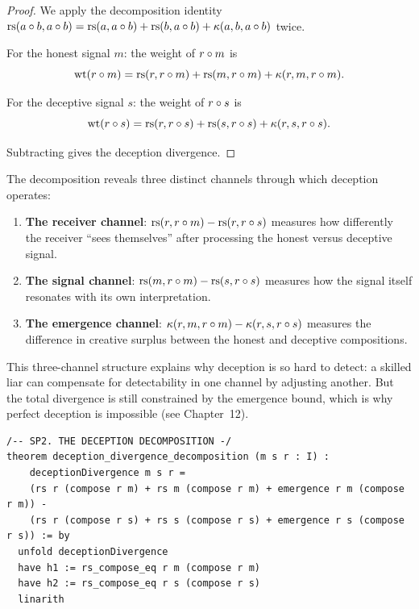 \begin{proof}
We apply the decomposition identity $\operatorname{rs}(a \circ b, a \circ b) = \operatorname{rs}(a, a \circ b) + \operatorname{rs}(b, a \circ b) + \kappa(a,b,a \circ b)$ twice.

For the honest signal $m$: the weight of $r \circ m$ is
\[
\operatorname{wt}(r \circ m) = \operatorname{rs}(r, r \circ m) + \operatorname{rs}(m, r \circ m) + \kappa(r,m,r \circ m).
\]

For the deceptive signal $s$: the weight of $r \circ s$ is
\[
\operatorname{wt}(r \circ s) = \operatorname{rs}(r, r \circ s) + \operatorname{rs}(s, r \circ s) + \kappa(r,s,r \circ s).
\]

Subtracting gives the deception divergence.
\end{proof}

\begin{interpretation}
The decomposition reveals three distinct channels through which deception operates:
\begin{enumerate}
\item \textbf{The receiver channel}: $\operatorname{rs}(r, r \circ m) - \operatorname{rs}(r, r \circ s)$ measures how differently the receiver ``sees themselves'' after processing the honest versus deceptive signal.
\item \textbf{The signal channel}: $\operatorname{rs}(m, r \circ m) - \operatorname{rs}(s, r \circ s)$ measures how the signal itself resonates with its own interpretation.
\item \textbf{The emergence channel}: $\kappa(r,m,r \circ m) - \kappa(r,s,r \circ s)$ measures the difference in creative surplus between the honest and deceptive compositions.
\end{enumerate}

This three-channel structure explains why deception is so hard to detect: a skilled liar can compensate for detectability in one channel by adjusting another. But the total divergence is still constrained by the emergence bound, which is why perfect deception is impossible (see Chapter~12).
\end{interpretation}

\begin{lstlisting}
/-- SP2. THE DECEPTION DECOMPOSITION -/
theorem deception_divergence_decomposition (m s r : I) :
    deceptionDivergence m s r =
    (rs r (compose r m) + rs m (compose r m) + emergence r m (compose r m)) -
    (rs r (compose r s) + rs s (compose r s) + emergence r s (compose r s)) := by
  unfold deceptionDivergence
  have h1 := rs_compose_eq r m (compose r m)
  have h2 := rs_compose_eq r s (compose r s)
  linarith
\end{lstlisting}

